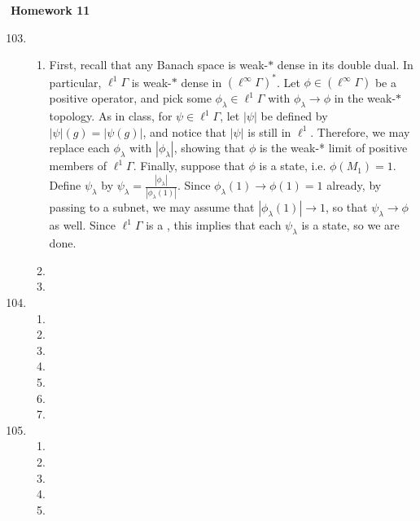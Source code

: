 \documentclass[a4paper,10pt]{report}
\begin{document}

\pagestyle{fancy}	
\fancyhf{} %
\setlength{\headheight}{60pt}

\begin{center}
	\textbf{Homework 11}
\end{center}
\begin{enumerate}
		\setcounter{enumi}{102}
	\item
		\begin{enumerate}
			\item First, recall that any Banach space is weak-$*$ dense in its double dual. In particular, $\ell^1\Gamma$ is weak-$*$ dense in $(\ell^\infty\Gamma)^*$. Let $\phi\in(\ell^\infty\Gamma)$ be a positive operator, and pick some $\phi_\lambda\in\ell^1\Gamma$ with $\phi_\lambda\to\phi$ in the weak-$*$ topology. As in class, for $\psi\in\ell^1\Gamma$, let $|\psi|$ be defined by $|\psi|(g)=|\psi(g)|$, and notice that $|\psi|$ is still in $\ell^1$. Therefore, we may replace each $\phi_\lambda$ with $|\phi_\lambda|$, showing that $\phi$ is the weak-* limit of positive members of $\ell^1\Gamma$. Finally, suppose that $\phi$ is a state, i.e. $\phi(M_1)=1$. Define $\psi_\lambda$ by $\psi_\lambda=\frac{|\phi_\lambda|}{|\phi_\lambda(1)|}$. Since $\phi_\lambda(1)\to\phi(1)=1$ already, by passing to a subnet, we may assume that $|\phi_\lambda(1)|\to 1$, so that $\psi_\lambda\to\phi$ as well. Since $\ell^1\Gamma$ is a \csa, this implies that each $\psi_\lambda$ is a state, so we are done. 
			\item 
			\item 
		\end{enumerate}
	\item
		\begin{enumerate}
			\item 
			\item 
			\item 
			\item 
			\item 
			\item 
			\item 
		\end{enumerate}
	\item
		\begin{enumerate}
			\item 
			\item 
			\item 
			\item 
			\item 
		\end{enumerate}
\end{enumerate}
\end{document}
